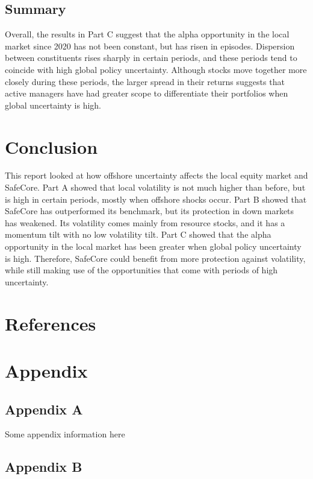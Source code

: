 \documentclass[11pt,preprint, authoryear]{elsarticle}
\numberwithin{equation}{section}
\numberwithin{figure}{section}
\numberwithin{table}{section}
\begin{document}
\subsection{Summary}\label{summary-2}

Overall, the results in Part C suggest that the alpha opportunity in the
local market since 2020 has not been constant, but has risen in
episodes. Dispersion between constituents rises sharply in certain
periods, and these periods tend to coincide with high global policy
uncertainty. Although stocks move together more closely during these
periods, the larger spread in their returns suggests that active
managers have had greater scope to differentiate their portfolios when
global uncertainty is high.

\section{Conclusion}\label{conclusion}

This report looked at how offshore uncertainty affects the local equity
market and SafeCore. Part A showed that local volatility is not much
higher than before, but is high in certain periods, mostly when offshore
shocks occur. Part B showed that SafeCore has outperformed its
benchmark, but its protection in down markets has weakened. Its
volatility comes mainly from resource stocks, and it has a momentum tilt
with no low volatility tilt. Part C showed that the alpha opportunity in
the local market has been greater when global policy uncertainty is
high. Therefore, SafeCore could benefit from more protection against
volatility, while still making use of the opportunities that come with
periods of high uncertainty.

\newpage

\section*{References}\label{references}

\protect{}\label{refs}

\section*{Appendix}\label{appendix}

\subsection*{Appendix A}\label{appendix-a}

Some appendix information here

\subsection*{Appendix B}\label{appendix-b}


\end{document}
